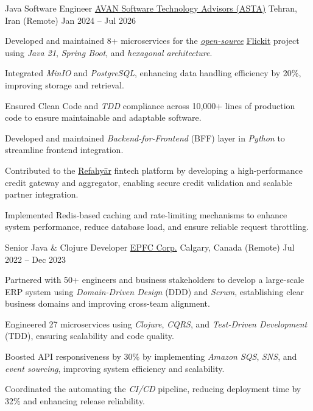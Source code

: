 \begin{cventries}
  \cventry
    {Java Software Engineer} %
    {\href{https://asta.ir/}{AVAN Software Technology Advisors (ASTA)}} %
    {Tehran, Iran (Remote)} %
    {Jan 2024 -- Jul 2026} %
    {
      \begin{cvitems}
        \item Developed and maintained 8+ microservices for the \href{https://github.com/flickit-platform}{\textit{open-source}} \href{https://www.flickit.org}{Flickit} project using \textit{Java 21}, \textit{Spring Boot}, and \textit{hexagonal architecture}.
        \item Integrated \textit{MinIO} and \textit{PostgreSQL}, enhancing data handling efficiency by 20\%, improving storage and retrieval.
        \item Ensured Clean Code and \textit{TDD} compliance across 10,000+ lines of production code to ensure maintainable and adaptable software.
        \item Developed and maintained \textit{Backend-for-Frontend} (BFF) layer in \textit{Python} to streamline frontend integration.
        \item Contributed to the \href{https://refahyar.ir}{Refahyār} fintech platform by developing a high-performance credit gateway and aggregator, enabling secure credit validation and scalable partner integration.
        \item Implemented Redis-based caching and rate-limiting mechanisms to enhance system performance, reduce database load, and ensure reliable request throttling.
      \end{cvitems}
    }

  \cventry
    {Senior Java \& Clojure Developer} %
    {\href{https://www.epfccorp.com/}{EPFC Corp.}}  %
    {Calgary, Canada (Remote)} %
    {Jul 2022 -- Dec 2023} %
    {
      \begin{cvitems}
        \item Partnered with 50+ engineers and business stakeholders to develop a large-scale ERP system using \textit{Domain-Driven Design} (DDD) and \textit{Scrum}, establishing clear business domains and improving cross-team alignment.
        \item Engineered 27 microservices using \textit{Clojure}, \textit{CQRS}, and \textit{Test-Driven Development} (TDD), ensuring scalability and code quality.
        \item Boosted API responsiveness by 30\% by implementing \textit{Amazon SQS}, \textit{SNS}, and \textit{event sourcing}, improving system efficiency and scalability.
        \item Coordinated the automating the \textit{CI/CD} pipeline, reducing deployment time by 32\% and enhancing release reliability.
      \end{cvitems}
    }


\end{cventries}
